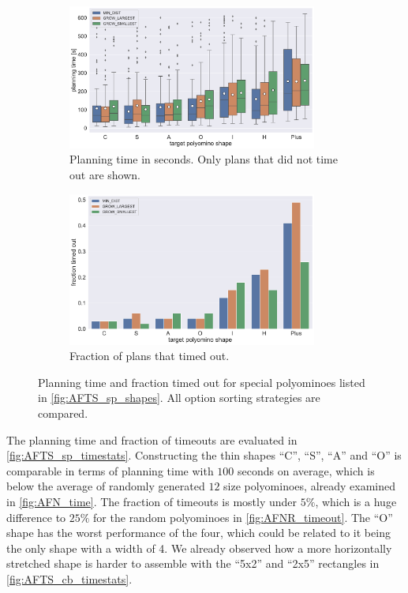 \begin{figure}
	\centering
	\begin{subfigure}[b]{\textwidth}
		\centering
		\includegraphics[width=0.9\textwidth]{figures/plots/AFTS_sp_time.pdf}
		\caption{Planning time in seconds. Only plans that did not time out are shown.}
		\label{fig:AFTS_sp_time}
	\end{subfigure}
	
	\begin{subfigure}[b]{\textwidth}
		\centering
		\includegraphics[width=0.9\textwidth]{figures/plots/AFTS_sp_timeout.pdf}
		\caption{Fraction of plans that timed out.}
		\label{fig:AFTS_sp_timeout}
	\end{subfigure}
	\caption[Planning time and fraction timed out for special polyominoes]{Planning time and fraction timed out for special polyominoes listed in \autoref{fig:AFTS_sp_shapes}. All option sorting strategies are compared.}
	\label{fig:AFTS_sp_timestats}
\end{figure}

The planning time and fraction of timeouts are evaluated in \autoref{fig:AFTS_sp_timestats}.
Constructing the thin shapes ``C'', ``S'', ``A'' and ``O'' is comparable in terms of planning time with $100$ seconds on average, which is below the average of randomly generated $12$ size polyominoes, already examined in \autoref{fig:AFN_time}.
The fraction of timeouts is mostly under $5\%$, which is a huge difference to $25\%$ for the random polyominoes in \autoref{fig:AFNR_timeout}.
The ``O'' shape has the worst performance of the four, which could be related to it being the only shape with a width of 4.
We already observed how a more horizontally stretched shape is harder to assemble with the ``5x2'' and ``2x5'' rectangles in \autoref{fig:AFTS_cb_timestats}.


